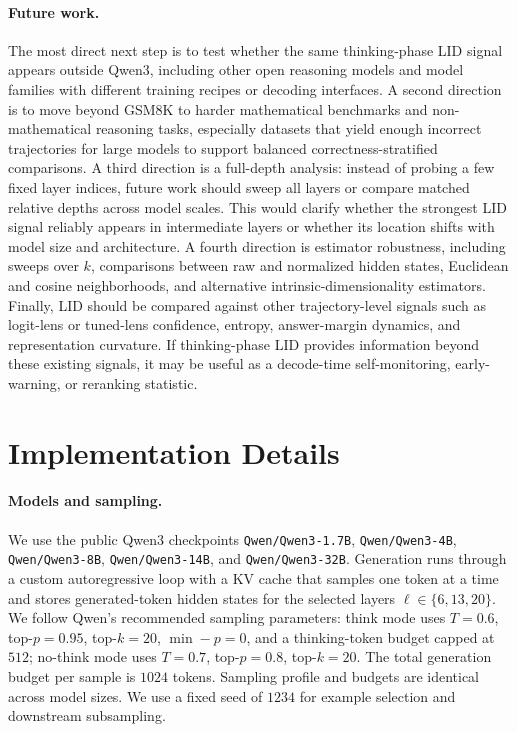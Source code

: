 \documentclass{article}
\theoremstyle{plain}
\theoremstyle{definition}
\theoremstyle{remark}
\begin{document}
\paragraph{Future work.}
The most direct next step is to test whether the same thinking-phase LID signal appears outside Qwen3, including other open reasoning models and model families with different training recipes or decoding interfaces. A second direction is to move beyond GSM8K to harder mathematical benchmarks and non-mathematical reasoning tasks, especially datasets that yield enough incorrect trajectories for large models to support balanced correctness-stratified comparisons. A third direction is a full-depth analysis: instead of probing a few fixed layer indices, future work should sweep all layers or compare matched relative depths across model scales. This would clarify whether the strongest LID signal reliably appears in intermediate layers or whether its location shifts with model size and architecture. A fourth direction is estimator robustness, including sweeps over $k$, comparisons between raw and normalized hidden states, Euclidean and cosine neighborhoods, and alternative intrinsic-dimensionality estimators. Finally, LID should be compared against other trajectory-level signals such as logit-lens or tuned-lens confidence, entropy, answer-margin dynamics, and representation curvature. If thinking-phase LID provides information beyond these existing signals, it may be useful as a decode-time self-monitoring, early-warning, or reranking statistic.

\clearpage
\newpage




\newpage
\appendix
\onecolumn

\section{Implementation Details}
\label{app:implementation}

\paragraph{Models and sampling.} We use the public Qwen3 checkpoints \texttt{Qwen/Qwen3-1.7B}, \texttt{Qwen/Qwen3-4B}, \texttt{Qwen/Qwen3-8B}, \texttt{Qwen/Qwen3-14B}, and \texttt{Qwen/Qwen3-32B}. Generation runs through a custom autoregressive loop with a KV cache that samples one token at a time and stores generated-token hidden states for the selected layers $\ell \in \{6, 13, 20\}$. We follow Qwen's recommended sampling parameters: think mode uses $T{=}0.6$, top-$p{=}0.95$, top-$k{=}20$, $\min{-}p{=}0$, and a thinking-token budget capped at $512$; no-think mode uses $T{=}0.7$, top-$p{=}0.8$, top-$k{=}20$. The total generation budget per sample is $1024$ tokens. Sampling profile and budgets are identical across model sizes. We use a fixed seed of $1234$ for example selection and downstream subsampling.
\end{document}
